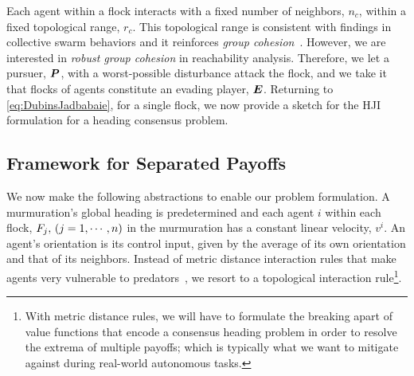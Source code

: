 %
%
Each agent within a flock interacts with a fixed number of neighbors, $n_c$, within a fixed topological range, $r_c$. This topological range %
is consistent with findings in collective swarm behaviors and it reinforces \textit{group cohesion}~\cite{Ballerini1232}. However, we are interested in \textit{robust group cohesion} in reachability analysis. Therefore, we let a pursuer, $\bm{P}$, with a worst-possible disturbance attack the flock, and we take it that flocks of agents constitute an evading player, $\bm{E}$. 
%
%
Returning to \eqref{eq:DubinsJadbabaie}, for a single flock, we now provide a sketch for the HJI formulation for a heading consensus problem. 

\subsection{Framework for Separated Payoffs}
%
We now make the following abstractions to enable our problem formulation.
%
A murmuration's global heading is predetermined and each agent $i$ within each flock, $F_j,\, (j=1, \cdots, n)$ in the murmuration has a constant linear velocity, $v^i$. An agent's orientation is its control input, given by the average of its own orientation and that of its neighbors. Instead of metric distance interaction rules that make agents very vulnerable to predators~\cite{Ballerini1232}, we resort to a topological interaction rule\footnote{With metric distance rules, we will have to formulate the breaking apart of value functions that encode a consensus heading problem in order to resolve the extrema of multiple payoffs; which is typically what we want to mitigate against during real-world autonomous tasks.}. 


